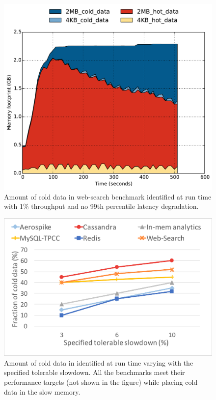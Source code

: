 \begin{figure}[t]
\centering
\includegraphics[width=1.0\columnwidth]{asplos2017/figures/wb-hugetmpfs-capacity_over_time.pdf}
\caption{Amount of cold data in web-search benchmark identified at run
time with 1\% throughput and no 99th percentile latency degradation.}
\label{fig:web-search-capacity}
\end{figure}


\begin{figure}[t]
\centering
\includegraphics[width=1.0\columnwidth]{asplos2017/figures/slowdown-capacity-sweep.pdf}
\caption{Amount of cold data in identified at run
time varying with the specified tolerable slowdown. All the benchmarks meet
their performance targets (not shown in the figure) while placing cold data in
the slow memory.}
\label{fig:slowdown-capacity}
\end{figure}

